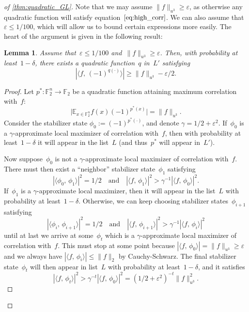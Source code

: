 \documentclass[10pt,a4paper]{amsart}
\newtheorem{lemma}{Lemma}
\newcommand{\E}{\mathbb{E}}
\newcommand{\F}{\mathbb{F}} %
\newcommand{\eps}{\varepsilon}
\begin{document}
\begin{proof}[ of \cref{thm:quadratic_GL}]
Note that we may assume $\|f\|_{u^3} \geq \eps$, as otherwise any quadratic function will satisfy equation~$\eqref{eq:high_corr}$.
We can also assume that~$\eps \leq 1/100$, which will allow us to bound certain expressions more easily.
The heart of the argument is given in the following result:

\begin{lemma} \label{lem:find_quad}
    Assume that~$\eps \leq 1/100$ and~$\|f\|_{u^3} \geq \eps$.
    Then, with probability at least~$1-\delta$, there exists a quadratic function~$q$ in~$L'$ satisfying
    $$|\langle f,\, (-1)^{q(\cdot)}\rangle| \geq \|f\|_{u^3} - \eps/2.$$
\end{lemma}

\begin{proof}
Let $p^*: \F_2^n \to \F_2$ be a quadratic function attaining maximum correlation with~$f$:
$$\big|\E_{x\in \F_2^n} f(x) (-1)^{p^*(x)}\big| = \|f\|_{u^3}.$$
Consider the stabilizer state $\phi_0 := (-1)^{p^*(\cdot)}$, and denote $\gamma = 1/2+\eps^2$.
If~$\phi_0$ is a $\gamma$-approximate local maximizer of correlation with~$f$, then with probability at least~$1-\delta$ it will appear in the list~$L$
(and thus~$p^*$ will appear in~$L'$).

Now suppose~$\phi_0$ is not a $\gamma$-approximate local maximizer of correlation with~$f$.
There must then exist a ``neighbor'' stabilizer state~$\phi_1$ satisfying
$$|\langle\phi_0,\, \phi_1\rangle|^2 = 1/2 \quad \text{and} \quad |\langle f,\, \phi_1 \rangle|^2 > \gamma^{-1} |\langle f,\, \phi_0 \rangle|^2.$$
If~$\phi_1$ is a $\gamma$-approximate local maximizer, then it will appear in the list~$L$ with probability at least~$1-\delta$.
Otherwise, we can keep choosing stabilizer states~$\phi_{i+1}$ satisfying
$$|\langle\phi_i,\, \phi_{i+1}\rangle|^2 = 1/2 \quad \text{and} \quad |\langle f,\, \phi_{i+1} \rangle|^2 > \gamma^{-1} |\langle f,\, \phi_i \rangle|^2$$
until at last we arrive at some~$\phi_t$ which is a $\gamma$-approximate local maximizer of correlation with~$f$.
This must stop at some point because $|\langle f,\, \phi_0 \rangle| = \|f\|_{u^3} \geq \eps$ and we always have $|\langle f,\, \phi_i \rangle| \leq \|f\|_2$ by Cauchy-Schwarz.
The final stabilizer state~$\phi_t$ will then appear in list~$L$ with probability at least~$1-\delta$, and it satisfies
\begin{equation} \label{eq:corr_phi_t}
    |\langle f,\, \phi_t \rangle|^2 > \gamma^{-t} |\langle f,\, \phi_0 \rangle|^2 = (1/2+\eps^2)^{-t} \|f\|_{u^3}^2.
\end{equation}


\end{proof}
\end{proof}
\end{document}
